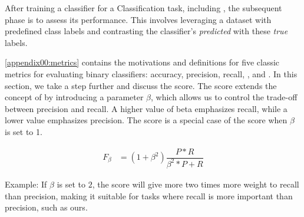 \label{02_evaluation_metrics}

After training a classifier for a Classification task, including \textclassification{}, the subsequent phase is to assess its performance. 
This involves leveraging a dataset with predefined class labels and contrasting the classifier's \emph{predicted} with these \emph{true} labels.

\appendixname{} \ref{appendix00:metrics} contains the motivations and definitions for five classic metrics for evaluating binary classifiers: accuracy, precision, recall, \fOne{}, and \auc{}.
In this section, we take a step further and discuss the \fBeta{} score. The \fBeta{} score extends the concept of \fOne{} by introducing a parameter $\beta$, which allows us to control the trade-off between precision and recall. A higher value of beta emphasizes recall, while a lower value emphasizes precision. The \fOne{} score is a special case of the \fBeta{} score when $\beta$ is set to 1.


\begin{align}
    F_\beta &= (1+\beta^2) \dfrac{P * R}{\beta^2* P + R} \label{eq:def_f_beta}
\end{align}


Example: If $\beta$ is set to $2$, the \fTwo{} score will give more two times more weight to recall than precision, making it suitable for tasks where recall is more important than precision, such as ours.



